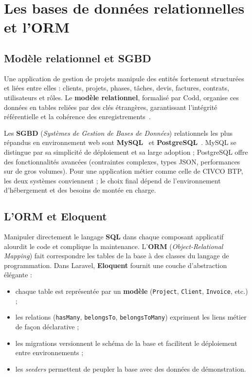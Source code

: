 \section{Les bases de données relationnelles et l'ORM}

\subsection{Modèle relationnel et SGBD}

Une application de gestion de projets manipule des entités fortement structurées et
liées entre elles : clients, projets, phases, tâches, devis, factures, contrats,
utilisateurs et rôles. Le \textbf{modèle relationnel}, formalisé par Codd, organise ces
données en tables reliées par des clés étrangères, garantissant l'intégrité référentielle
et la cohérence des enregistrements~\cite{fowler2019patterns}.

\medskip

Les \textbf{SGBD} (\textit{Systèmes de Gestion de Bases de Données}) relationnels les
plus répandus en environnement web sont \textbf{MySQL}~\cite{mysql} et
\textbf{PostgreSQL}~\cite{postgresql}. MySQL se distingue par sa simplicité de déploiement
et sa large adoption ; PostgreSQL offre des fonctionnalités avancées (contraintes
complexes, types JSON, performances sur de gros volumes). Pour une application métier
comme celle de CIVCO BTP, les deux systèmes conviennent ; le choix final dépend de
l'environnement d'hébergement et des besoins de montée en charge.

\subsection{L'ORM et Eloquent}

Manipuler directement le langage \textbf{SQL} dans chaque composant applicatif alourdit
le code et complique la maintenance. L'\textbf{ORM} (\textit{Object-Relational Mapping})
fait correspondre les tables de la base à des classes du langage de programmation.
Dans Laravel, \textbf{Eloquent} fournit une couche d'abstraction élégante :

\begin{itemize}
  \item chaque table est représentée par un \textbf{modèle} (\texttt{Project},
  \texttt{Client}, \texttt{Invoice}, etc.) ;
  \item les relations (\texttt{hasMany}, \texttt{belongsTo}, \texttt{belongsToMany})
  expriment les liens métier de façon déclarative ;
  \item les migrations versionnent le schéma de la base et facilitent le déploiement
  entre environnements ;
  \item les \textit{seeders} permettent de peupler la base avec des données de démonstration.
\end{itemize}

